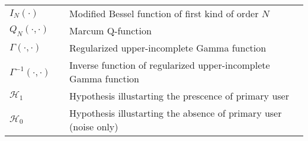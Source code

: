 \begin{longtable}{p{}p{}p{}}
       $I_{N}(\cdot)$	        & &	Modified Bessel function of first kind of order $N$ \\		
       $Q_{N}(\cdot, \cdot)$	& &	Marcum Q-function \\		
       $\Gamma(\cdot, \cdot)$	& &	Regularized upper-incomplete Gamma function\\		
       $\Gamma^{-1}(\cdot, \cdot)$	& &	Inverse function of regularized upper-incomplete Gamma function\\		
       $\mathcal H_1$			& &	Hypothesis illustarting the prescence of primary user\\	
       $\mathcal H_0$			& &	Hypothesis illustarting the absence of primary user (noise only) \\		
\end{longtable}
  




